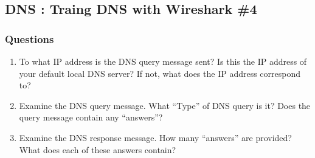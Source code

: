 \subsection{DNS : Traing DNS with Wireshark \#4}
    \subsubsection*{Questions}
    \begin{enumerate}[label=\bfseries Problem \arabic*:,leftmargin=*,labelindent=1em]\addtocounter{enumi}{14}
        \item To what IP address is the DNS query message sent? 
        Is this the IP address of your default local DNS server? 
        If not, what does the IP address correspond to?\\[0.2mm]
            \soln
            
        \item Examine the DNS query message. 
        What “Type” of DNS query is it? Does the query message contain any “answers”?\\[0.2mm]
            \soln
            
        \item Examine the DNS response message. How many “answers” are provided?
        What does each of these answers contain?\\[0.2mm]
            \soln

    \end{enumerate}
